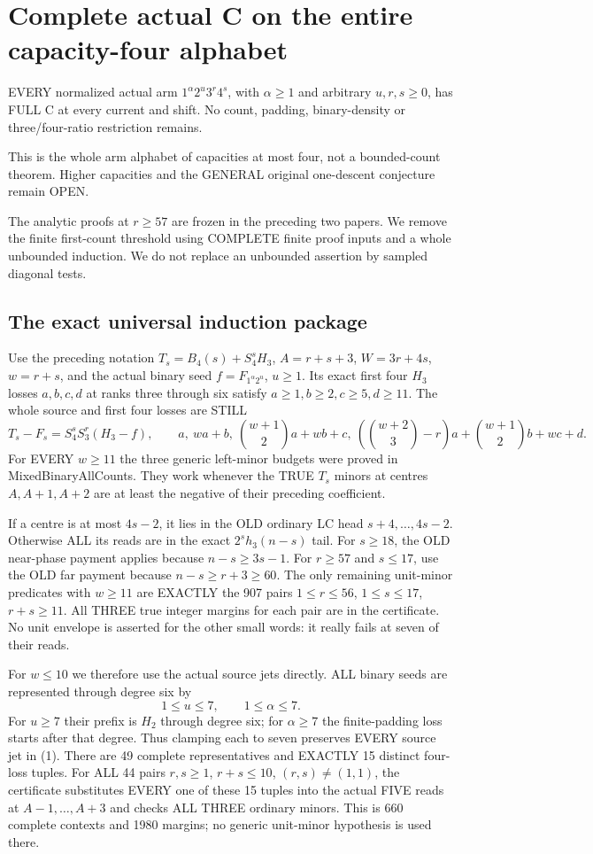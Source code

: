 \section{Complete actual C on the entire capacity-four alphabet}
\begin{theorem}
EVERY normalized actual arm $1^\alpha2^u3^r4^s$, with $\alpha\ge1$
and arbitrary $u,r,s\ge0$, has FULL C at every current and shift.
No count, padding, binary-density or three/four-ratio restriction remains.
\end{theorem}
This is the whole arm alphabet of capacities at most four, not a
bounded-count theorem. Higher capacities and the GENERAL original
one-descent conjecture remain OPEN.

The analytic proofs at $r\ge57$ are frozen in the preceding two
papers. We remove the finite first-count threshold using COMPLETE
finite proof inputs and a whole unbounded induction. We do not
replace an unbounded assertion by sampled diagonal tests.

\subsection{The exact universal induction package}
Use the preceding notation $T_s=B_4(s)+S_4^sH_3$, $A=r+s+3$,
$W=3r+4s$, $w=r+s$, and the actual binary seed $f=F_{1^\alpha2^u}$,
$u\ge1$. Its exact first four $H_3$ losses $a,b,c,d$ at ranks
three through six satisfy $a\ge1,b\ge2,c\ge5,d\ge11$.
The whole source and first four losses are STILL
\[
 T_s-F_s=S_4^sS_3^r(H_3-f),\qquad
 a,\ wa+b,\ \binom{w+1}{2}a+wb+c,
 \ (\binom{w+2}{3}-r)a+\binom{w+1}{2}b+wc+d .          \tag{1}
\]
For EVERY $w\ge11$ the three generic left-minor budgets were
proved in MixedBinaryAllCounts. They work whenever the TRUE
$T_s$ minors at centres $A,A+1,A+2$ are at least the negative
of their preceding coefficient.

If a centre is at most $4s-2$, it lies in the OLD ordinary LC
head $s+4,\ldots,4s-2$. Otherwise ALL its reads are in the
exact $2^sh_3(n-s)$ tail. For $s\ge18$, the OLD near-phase
payment applies because $n-s\ge3s-1$. For $r\ge57$ and
$s\le17$, use the OLD far payment because $n-s\ge r+3\ge60$.
The only remaining unit-minor predicates with $w\ge11$ are
EXACTLY the 907 pairs $1\le r\le56$, $1\le s\le17$, $r+s\ge11$.
All THREE true integer margins for each pair are in the certificate.
No unit envelope is asserted for the other small words: it really
fails at seven of their reads.

For $w\le10$ we therefore use the actual source jets directly.
ALL binary seeds are represented through degree six by
\[
               1\le u\le7,\qquad1\le\alpha\le7.        \tag{2}
\]
For $u\ge7$ their prefix is $H_2$ through degree six; for
$\alpha\ge7$ the finite-padding loss starts after that degree.
Thus clamping each to seven preserves EVERY source jet in (1).
There are 49 complete representatives and EXACTLY 15 distinct
four-loss tuples. For ALL 44 pairs $r,s\ge1$, $r+s\le10$,
$(r,s)\ne(1,1)$, the certificate substitutes EVERY one of these
15 tuples into the actual FIVE reads at $A-1,\ldots,A+3$ and
checks ALL THREE ordinary minors. This is 660 complete contexts
and 1980 margins; no generic unit-minor hypothesis is used there.

